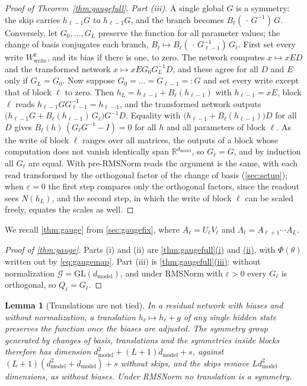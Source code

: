 \documentclass[10pt]{article}
\newtheorem{lemma}[theorem]{Lemma}
\theoremstyle{definition}
\theoremstyle{remark}
\newcommand{\R}{\mathbb{R}}
\newcommand{\Wwrite}{W_{\mathrm{write}}}
\newcommand{\dm}{d_{\mathrm{model}}}
\newcommand{\GL}{\mathrm{GL}}
\newcommand{\G}{\mathcal{G}}
\DeclareRobustCommand{\cpref}[2]{\hyperref[#1:#2]{\cref*{#1}(#2)}}
\DeclareRobustCommand{\ptlink}[2]{\hyperref[#1:#2]{(#2)}}
\begin{document}
\begin{proof}[Proof of Theorem~\ref{thm:gaugefull}]
\emph{Part (iii).} A single global $G$ is a symmetry: the skip carries $h_{\ell-1}G$ to $h_{\ell-1}G$, and the branch becomes $B_\ell(\,\cdot\,G^{-1})\,G$. Conversely, let $G_0, \dots, G_L$ preserve the function for all parameter values; the change of basis conjugates each branch, $B_\ell \mapsto B_\ell(\,\cdot\,G_{\ell-1}^{-1})\,G_\ell$. First set every write $\Wwrite^{k}$, and its bias if there is one, to zero. The network computes $x \mapsto xED$ and the transformed network $x \mapsto xEG_0G_L^{-1}D$, and these agree for all $D$ and $E$ only if $G_L = G_0$. Now suppose $G_0 = \dots = G_{\ell-1} =: G$ and set every write except that of block $\ell$ to zero. Then $h_L = h_{\ell-1} + B_\ell(h_{\ell-1})$ with $h_{\ell-1} = xE$, block $\ell$ reads $h_{\ell-1}GG_{\ell-1}^{-1} = h_{\ell-1}$, and the transformed network outputs $\big(h_{\ell-1}G + B_\ell(h_{\ell-1})\,G_\ell\big)G^{-1}D$. Equality with $\big(h_{\ell-1} + B_\ell(h_{\ell-1})\big)D$ for all $D$ gives $B_\ell(h)\,(G_\ell G^{-1} - I) = 0$ for all $h$ and all parameters of block $\ell$. As the write of block $\ell$ ranges over all matrices, the outputs of a block whose computation does not vanish identically span $\R^{\dm}$, so $G_\ell = G$, and by induction all $G_\ell$ are equal. With pre-RMSNorm reads the argument is the same, with each read transformed by the orthogonal factor of the change of basis (\cref{sec:setup}); when $\varepsilon = 0$ the first step compares only the orthogonal factors, since the readout sees $N(h_L)$, and the second step, in which the write of block $\ell$ can be scaled freely, equates the scales as well.
\end{proof}

We recall \cref{thm:gauge} from \cref{sec:gaugefix}, where $A_\ell = U_\ell V_\ell$ and $\Lambda_\ell = A_{\ell+1}\cdots A_L$.
\thmGauge*

\begin{proof}[Proof of \cref{thm:gauge}]
Parts (i) and (ii) are \cpref{thm:gaugefull}{i} and \ptlink{thm:gaugefull}{ii}, with $\Phi(\theta)$ written out by \cref{eq:gaugemap}. Part (iii) is \cpref{thm:gaugefull}{iii}: without normalization $\G = \GL(\dm)$, and under RMSNorm with $\varepsilon > 0$ every $G_\ell$ is orthogonal, so $Q_\ell = G_\ell$.
\end{proof}

\begin{lemma}[Translations are not tied]\label{lem:translations}
In a residual network with biases and without normalization, a translation $h_\ell \mapsto h_\ell + g$ of any single hidden state preserves the function once the biases are adjusted. The symmetry group generated by changes of basis, translations and the symmetries inside blocks therefore has dimension $\dm^2 + (L+1)\dm + s$, against $(L+1)(\dm^2 + \dm) + s$ without skips, and the skips remove $L\dm^2$ dimensions, as without biases. Under RMSNorm no translation is a symmetry.
\end{lemma}
\end{document}
